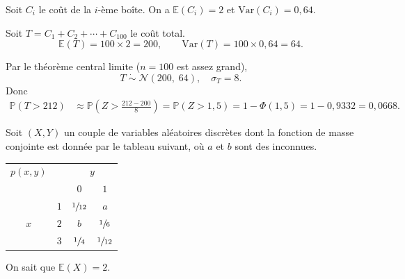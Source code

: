 \begin{questions}
\begin{parts}
    \begin{solution}
    Soit $C_i$ le coût de la $i$-ème boîte. On a $\mathbb{E}(C_i)=2$ et $\text{Var}(C_i)=0{,}64$.

    Soit $T = C_1 + C_2 + \cdots + C_{100}$ le coût total.
    \[
    \mathbb{E}(T) = 100 \times 2 = 200, \qquad
    \text{Var}(T) = 100 \times 0{,}64 = 64.
    \]

    Par le théorème central limite ($n=100$ est assez grand),
    \[
    T \;\dot\sim\; \mathcal{N}(200,\;64), \quad \sigma_T = 8.
    \]
    Donc
    \begin{align*}
    \mathbb{P}(T > 212)
    &\approx \mathbb{P}\!\left(Z > \frac{212 - 200}{8}\right)
    = \mathbb{P}(Z > 1{,}5)
    = 1 - \Phi(1{,}5)
    = 1 - 0{,}9332
    = 0{,}0668.
    \end{align*}
    \end{solution}
\end{parts}



\newpage

\question[] Soit $(X, Y)$ un couple de variables aléatoires discrètes dont la fonction de masse conjointe est donnée par le tableau suivant, où $a$ et $b$ sont des inconnues.

\begin{center}
\begin{tabular}{cc|cc}
$p(x,y)$ & & \multicolumn{2}{c}{$y$} \\
 & & $0$ & $1$  \\
\hline
 & $1$ & $\sfrac{1}{12}$ & $a$  \\
$x$ & $2$ & $b$ & $\sfrac{1}{6}$  \\
 & $3$ & $\sfrac{1}{4}$ & $\sfrac{1}{12}$  \\
\end{tabular}
\end{center}

On sait que $\mathbb{E}(X)=2$.

\end{questions}
